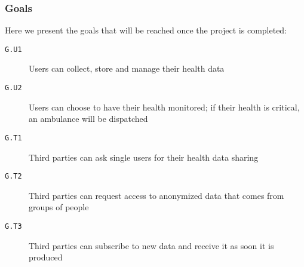       \subsubsection{Goals}

        Here we present the goals that will be reached once the project is completed:

        \begin{description}
          \item[\texttt{G.U1}] Users can collect, store and manage their health data
          \item[\texttt{G.U2}] Users can choose to have their health monitored; if their health is critical, an ambulance will be dispatched
          \item[\texttt{G.T1}] Third parties can ask single users for their health data sharing
          \item[\texttt{G.T2}] Third parties can request access to anonymized data that comes from groups of people
          \item[\texttt{G.T3}] Third parties can subscribe to new data and receive it as soon it is produced
        \end{description}


